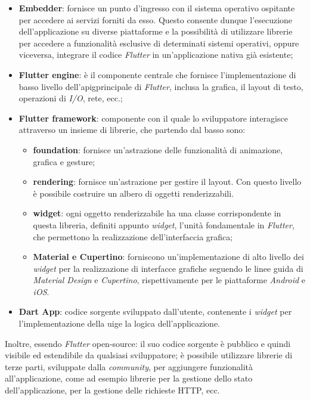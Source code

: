 \begin{itemize}
    \item \textbf{Embedder}: fornisce un punto d'ingresso con il sistema operativo ospitante per accedere ai servizi forniti da esso. Questo consente dunque l'esecuzione dell'applicazione su diverse piattaforme e la possibilità di utilizzare librerie per accedere a funzionalità esclusive di determinati sistemi operativi, oppure viceversa, integrare il codice \emph{Flutter} in un'applicazione nativa già esistente;
    \item \textbf{Flutter engine}: è il componente centrale che fornisce l'implementazione di basso livello dell'\gls{apig}\glsoccur principale di \emph{Flutter}, inclusa la grafica, il layout di testo, operazioni di \emph{I/O}, rete, ecc.;
    \item \textbf{Flutter framework}: componente con il quale lo sviluppatore interagisce attraverso un insieme di librerie, che partendo dal basso sono:
    \begin{itemize}
        \item \textbf{foundation}: fornisce un'astrazione delle funzionalità di animazione, grafica e \gls{gesture}\glsoccur;
        \item \textbf{rendering}: fornisce un'astrazione per gestire il layout. Con questo livello è possibile costruire un albero di oggetti renderizzabili.
        \item \textbf{widget}: ogni oggetto renderizzabile ha una classe corrispondente in questa libreria, definiti appunto \emph{widget}, l'unità fondamentale in \emph{Flutter}, che permettono la realizzazione dell'interfaccia grafica;
        \item \textbf{Material e Cupertino}: forniscono un'implementazione di alto livello dei \emph{widget} per la realizzazione di interfacce grafiche seguendo le linee guida di \emph{Material Design} e \emph{Cupertino}, rispettivamente per le piattaforme \emph{Android} e \emph{iOS}.
    \end{itemize}
    \item \textbf{Dart App}: codice sorgente sviluppato dall'utente, contenente i \emph{widget} per l'implementazione della \gls{uig}\glsoccur e la logica dell'applicazione.
\end{itemize}

Inoltre, essendo \emph{Flutter} \gls{open-source}\glsoccur: il suo codice sorgente è pubblico e quindi visibile ed estendibile da qualsiasi sviluppatore; è possibile utilizzare librerie di terze parti, sviluppate dalla \emph{community}, per aggiungere funzionalità all'applicazione, come ad esempio librerie per la gestione dello stato dell'applicazione, per la gestione delle richieste HTTP, ecc. \\

